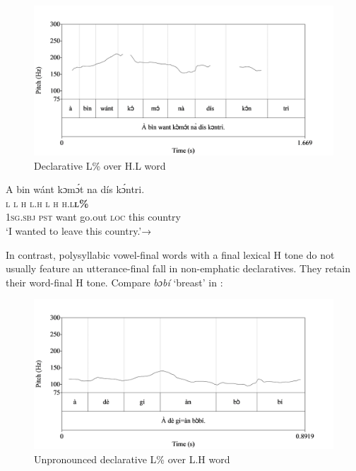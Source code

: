 \begin{figure}
\caption{Declarative L\% over H.L word}
\label{fig:key:3.27}
\includegraphics[height=.3\textheight]{figures/yakpomod-img29.png}
\end{figure}

 
\ea%
    \label{ex:key:80}
    \glll   A    bin  wánt  kɔmɔ́t  na  dís  kɔ́ntri.\\
\textsc{l}    \textsc{l}  \textsc{h}    \textsc{l.h}    \textsc{l}  \textsc{h}  \textsc{h.l}\textbf{\textsc{l\%}}\\
\textsc{1sg.sbj}  \textsc{pst}  want  go.out  \textsc{loc}  this  country\\
\glt ‘I wanted to leave this country.’→  
\z

In contrast, polysyllabic vowel-final words with a final lexical H tone do not usually feature an utterance-final fall in non-emphatic declaratives. They retain their word-final H tone. Compare \textit{bɔbí} ‘breast’ in : 

\begin{figure}
\caption{Unpronounced declarative L\% over L.H word}
\label{fig:key:3.28}
\includegraphics[height=.3\textheight]{figures/yakpomod-img30.png}
\end{figure}
 


